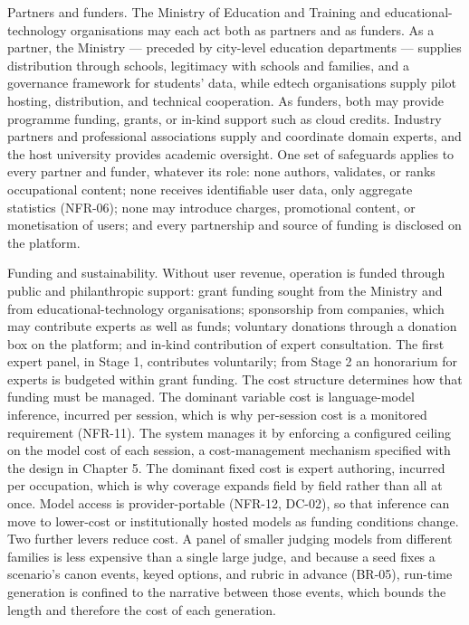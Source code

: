 Partners and funders. The Ministry of Education and Training and educational-\allowbreak{}technology organisations may each act both as partners and as funders. As a partner, the Ministry --- preceded by city-level education departments --- supplies distribution through schools, legitimacy with schools and families, and a governance framework for students' data, while edtech organisations supply pilot hosting, distribution, and technical cooperation. As funders, both may provide programme funding, grants, or in-kind support such as cloud credits. Industry partners and professional associations supply and coordinate domain experts, and the host university provides academic oversight. One set of safeguards applies to every partner and funder, whatever its role: none authors, validates, or ranks occupational content; none receives identifiable user data, only aggregate statistics (NFR-06); none may introduce charges, promotional content, or monetisation of users; and every partnership and source of funding is disclosed on the platform.

Funding and sustainability. Without user revenue, operation is funded through public and philanthropic support: grant funding sought from the Ministry and from educational-\allowbreak{}technology organisations; sponsorship from companies, which may contribute experts as well as funds; voluntary donations through a donation box on the platform; and in-kind contribution of expert consultation. The first expert panel, in Stage 1, contributes voluntarily; from Stage 2 an honorarium for experts is budgeted within grant funding. The cost structure determines how that funding must be managed. The dominant variable cost is language-\allowbreak{}model inference, incurred per session, which is why per-session cost is a monitored requirement (NFR-11). The system manages it by enforcing a configured ceiling on the model cost of each session, a cost-\allowbreak{}management mechanism specified with the design in Chapter 5. The dominant fixed cost is expert authoring, incurred per occupation, which is why coverage expands field by field rather than all at once. Model access is provider-\allowbreak{}portable (NFR-12, DC-02), so that inference can move to lower-cost or institutionally hosted models as funding conditions change. Two further levers reduce cost. A panel of smaller judging models from different families is less expensive than a single large judge\cite{r74}, and because a seed fixes a scenario's canon events, keyed options, and rubric in advance (BR-05), run-time generation is confined to the narrative between those events, which bounds the length and therefore the cost of each generation.

